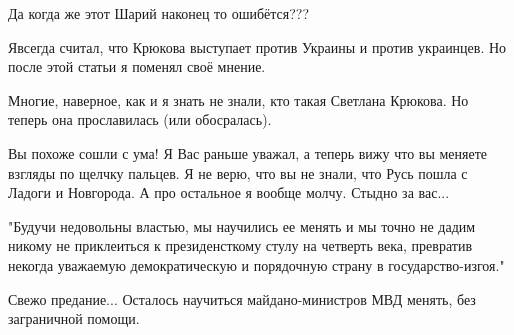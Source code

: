 \begin{itemize}
 
Да когда же этот Шарий наконец то ошибётся???

 
Явсегда считал, что Крюкова выступает против Украины и против украинцев. Но после этой статьи я поменял своё мнение.

 
Многие, наверное, как и я знать не знали, кто такая Светлана Крюкова. Но теперь
она прославилась (или обосралась).

 
Вы похоже сошли с ума! Я Вас раньше уважал, а теперь вижу что вы меняете взгляды
по щелчку пальцев. Я не верю, что вы не знали, что Русь пошла с Ладоги и
Новгорода. А про остальное я вообще молчу. Стыдно за вас...

 

"Будучи недовольны властью, мы научились ее менять и мы точно не дадим никому
не приклеиться к президенсткому стулу на четверть века, превратив некогда
уважаемую демократическую и порядочную страну в государство-изгоя."

Свежо предание... Осталось научиться майдано-министров МВД менять, без
заграничной помощи.


 


\end{itemize}
